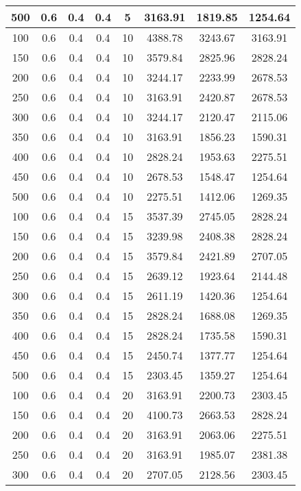 \documentclass[a4paper, 12pt]{extreport}
\begin{document}
\begin{itemize}
\begin{longtable}{|c|c|c|c|c|c|c|c|}
			500 & 0.6 & 0.4 & 0.4 & 5 & 3163.91 & 1819.85 & 1254.64 \\\hline
			100 & 0.6 & 0.4 & 0.4 & 10 & 4388.78 & 3243.67 & 3163.91 \\\hline
			150 & 0.6 & 0.4 & 0.4 & 10 & 3579.84 & 2825.96 & 2828.24 \\\hline
			200 & 0.6 & 0.4 & 0.4 & 10 & 3244.17 & 2233.99 & 2678.53 \\\hline
			250 & 0.6 & 0.4 & 0.4 & 10 & 3163.91 & 2420.87 & 2678.53 \\\hline
			300 & 0.6 & 0.4 & 0.4 & 10 & 3244.17 & 2120.47 & 2115.06 \\\hline
			350 & 0.6 & 0.4 & 0.4 & 10 & 3163.91 & 1856.23 & 1590.31 \\\hline
			400 & 0.6 & 0.4 & 0.4 & 10 & 2828.24 & 1953.63 & 2275.51 \\\hline
			450 & 0.6 & 0.4 & 0.4 & 10 & 2678.53 & 1548.47 & 1254.64 \\\hline
			500 & 0.6 & 0.4 & 0.4 & 10 & 2275.51 & 1412.06 & 1269.35 \\\hline
			100 & 0.6 & 0.4 & 0.4 & 15 & 3537.39 & 2745.05 & 2828.24 \\\hline
			150 & 0.6 & 0.4 & 0.4 & 15 & 3239.98 & 2408.38 & 2828.24 \\\hline
			200 & 0.6 & 0.4 & 0.4 & 15 & 3579.84 & 2421.89 & 2707.05 \\\hline
			250 & 0.6 & 0.4 & 0.4 & 15 & 2639.12 & 1923.64 & 2144.48 \\\hline
			300 & 0.6 & 0.4 & 0.4 & 15 & 2611.19 & 1420.36 & 1254.64 \\\hline
			350 & 0.6 & 0.4 & 0.4 & 15 & 2828.24 & 1688.08 & 1269.35 \\\hline
			400 & 0.6 & 0.4 & 0.4 & 15 & 2828.24 & 1735.58 & 1590.31 \\\hline
			450 & 0.6 & 0.4 & 0.4 & 15 & 2450.74 & 1377.77 & 1254.64 \\\hline
			500 & 0.6 & 0.4 & 0.4 & 15 & 2303.45 & 1359.27 & 1254.64 \\\hline
			100 & 0.6 & 0.4 & 0.4 & 20 & 3163.91 & 2200.73 & 2303.45 \\\hline
			150 & 0.6 & 0.4 & 0.4 & 20 & 4100.73 & 2663.53 & 2828.24 \\\hline
			200 & 0.6 & 0.4 & 0.4 & 20 & 3163.91 & 2063.06 & 2275.51 \\\hline
			250 & 0.6 & 0.4 & 0.4 & 20 & 3163.91 & 1985.07 & 2381.38 \\\hline
			300 & 0.6 & 0.4 & 0.4 & 20 & 2707.05 & 2128.56 & 2303.45 \\\hline

\end{longtable}
\end{itemize}
\end{document}
